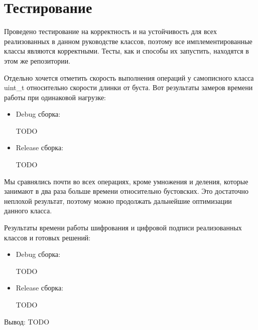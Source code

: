 
\section{Тестирование}
Проведено тестирование на корректность и на устойчивость для всех реализованных в данном руководстве классов, поэтому все имплементированные классы являются корректными. Тесты, как и способы их запустить, находятся в этом же репозитории.

Отдельно хочется отметить скорость выполнения операций у самописного класса uint\_t относительно скорости длинки от буста. Вот результаты замеров времени работы при одинаковой нагрузке:
\begin{itemize}
  \item Debug сборка:

    TODO

  \item Release сборка:

    TODO
\end{itemize}

Мы сравнялись почти во всех операциях, кроме умножения и деления, которые занимают в два раза больше времени относительно бустовских. Это достаточно неплохой результат, поэтому можно продолжать дальнейшие оптимизации данного класса.

Результаты времени работы шифрования и цифровой подписи реализованных классов и готовых решений:
\begin{itemize}
  \item Debug сборка:

    TODO

  \item Release сборка:

    TODO
\end{itemize}

Вывод: TODO
